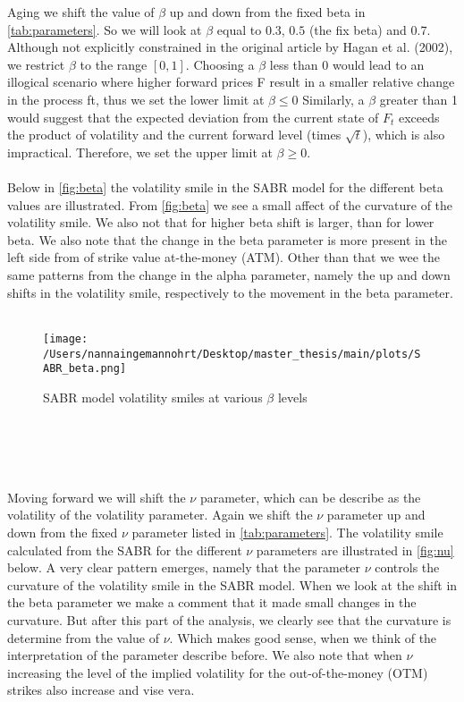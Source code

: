 Aging we shift the value of $\beta$ up and down from the fixed beta in \autoref{tab:parameters}. So we will look at $\beta$ equal to $0.3$,
$0.5$ (the fix beta) and $0.7$. 
Although not explicitly constrained in the original article by Hagan et al. (2002), we restrict $\beta$ to the range $[0, 1]$. 
Choosing a $\beta$ less than 0 would lead to an illogical scenario where higher forward prices F result in a smaller 
relative change in the process ft, thus we set the lower limit at $\beta \leq 0$ Similarly, a $\beta$ greater than 1 would 
suggest that the expected deviation from the current state of $F_t$ exceeds the product of volatility and the current 
forward level (times $\sqrt{t}$), which is also impractical. Therefore, we set the upper limit at $\beta \geq 0$.
\\\\
Below in \autoref{fig:beta} the volatility smile in the SABR model for the different beta values are illustrated.
From \autoref{fig:beta} we see a small affect of the curvature of the volatility smile. We also not that for higher 
beta shift is larger, than for lower beta. We also note that the change in the beta parameter is more present in 
the left side from of strike value at-the-money (ATM). Other than that we wee the same patterns from the change in 
the alpha parameter, namely the up and down shifts in the volatility smile, respectively to the movement in the 
beta parameter.
\\\\
\begin{figure}[htbp]
    \centering
    \texttt{[image: /Users/nannaingemannohrt/Desktop/master\_thesis/main/plots/SABR\_beta.png]}
    \caption{SABR model volatility smiles at various $\beta$ levels}
    \label{fig:beta}
\end{figure}
\\\\
\\\\
\noindent
Moving forward we will shift the $\nu$ parameter, which can be describe as the volatility of the volatility parameter.
Again we shift the $\nu$ parameter up and down from the fixed $\nu$ parameter listed in \autoref{tab:parameters}.
The volatility smile calculated from the SABR for the different $\nu$ parameters are illustrated in \autoref{fig:nu} below.
A very clear pattern emerges, namely that the parameter $\nu$ controls the curvature of the volatility smile in
the SABR model. When we look at the shift in the beta parameter we make a comment that it made small changes in 
the curvature. But after this part of the analysis, we clearly see that the curvature is determine from the value
of $\nu$. Which makes good sense, when we think of the interpretation of the parameter describe before.
We also note that when $\nu$  increasing the level of the implied volatility for the 
out-of-the-money (OTM) strikes also increase and vise vera.

